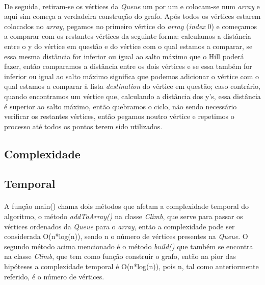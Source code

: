 \documentclass[12pt]{article}
\begin{document}
\paragraph{}
De seguida, retiram-se os vértices da \textit{Queue} um por um e colocam-se num \textit{array} e aqui sim começa a verdadeira construção do grafo. Após todos os vértices estarem colocados no \textit{array}, pegamos no primeiro vértice do \textit{array} (\textit{index} 0) e começamos a comparar com os restantes vértices da seguinte forma: calculamos a distância entre o y do vértice em questão e do vértice com o qual estamos a comparar, se essa mesma distância for inferior ou igual ao salto máximo que o Hill poderá fazer, então comparamos a distância entre os dois vértices e se essa também for inferior ou igual ao salto máximo significa que podemos adicionar o vértice com o qual estamos a comparar à lista \textit{destination} do vértice em questão; caso contrário, quando encontramos um vértice que, calculando a distância dos y's, essa distância é superior ao salto máximo, então quebramos o ciclo, não sendo necessário verificar os restantes vértices, então pegamos noutro vértice e repetimos o processo até todos os pontos terem sido utilizados.
\paragraph{}
\newpage
\begin{center}
\section{Complexidade}
\end{center}
\subsection{Temporal}
\paragraph{}
A função main() chama dois métodos que afetam a complexidade temporal do algoritmo, o método \textit{addToArray()} na classe \textit{Climb}, que serve para passar os vértices ordenados da \textit{Queue} para o \textit{array}, então a complexidade pode ser considerada O(n*log(n)), sendo n o número de vértices presentes na \textit{Queue}. O segundo método acima mencionado é o método \textit{build()} que também se encontra na classe \textit{Climb}, que tem como função construir o grafo, então na pior das hipóteses a complexidade temporal é O(n*log(n)), pois n, tal como anteriormente referido, é o número de vértices.
\end{document}
